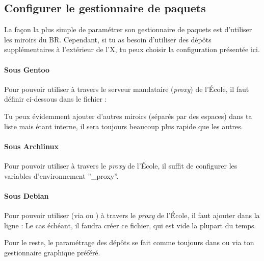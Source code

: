\subsection{Configurer le gestionnaire de paquets}

La fa\c con la plus simple de param\'etrer son gestionnaire de paquets est d'utiliser les miroirs du BR. Cependant, si tu as besoin d'utiliser des d\'ep\^ots suppl\'ementaires \`a l'ext\'erieur de l'X, tu peux choisir
la configuration pr\'esent\'ee ici.

\paragraph{Sous Gentoo}
\label{gentoo_mirror} Pour pouvoir utiliser  \`a  travers le serveur mandataire (\emph{proxy}) de l'\'Ecole, il faut d\'efinir %
ci-dessous dans le fichier  :

Tu peux \'evidemment ajouter d'autres miroirs (s\'epar\'es par des espaces) dans ta liste mais  \'etant interne, il sera toujours beaucoup plus rapide que les autres.

\paragraph{Sous Archlinux}
Pour pouvoir utiliser  \`a travers le \emph{proxy} de l'\'Ecole, il suffit de configurer les variables d'environnement ''\_proxy''.
\noindent {}


\paragraph{Sous Debian}
\label{debian_mirror} Pour pouvoir utiliser  (via  ou ) \`a travers le \emph{proxy} de l'\'Ecole, il faut ajouter dans  la ligne :
Le cas \'ech\'eant, il faudra cr\'eer ce fichier, qui est vide la plupart du temps.

Pour le reste, le param\'etrage des d\'ep\^ots se fait comme toujours dans  ou via ton gestionnaire graphique pr\'ef\'er\'e.
